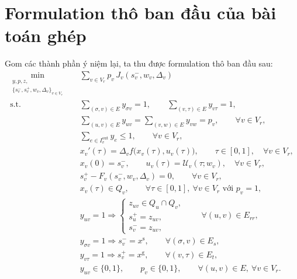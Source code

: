 \documentclass[12pt]{article}
\begin{document}
\section{Formulation thô ban đầu của bài toán ghép}

Gom các thành phần ý niệm lại, ta thu được formulation thô ban đầu sau:
\begin{align}
\min_{\substack{y,p,z,\\ \{s_v^-,s_v^+,w_v,\Delta_v\}_{v\in V_r}}}
\quad & \sum_{v\in V_r} p_v\,J_v(s_v^-,w_v,\Delta_v)
\label{eq:joint_problem_obj}\\
\text{s.t.}\quad
& \sum_{(\sigma,v)\in E} y_{\sigma v}=1,
\qquad
\sum_{(v,\tau)\in E} y_{v\tau}=1,
\label{eq:joint_problem_source_sink}\\
& \sum_{(u,v)\in E} y_{uv}
=
\sum_{(v,w)\in E} y_{vw}
=
p_v,
\qquad \forall v\in V_r,
\label{eq:joint_problem_flow}\\
& \sum_{e\in I_v^{\mathrm{out}}} y_e \le 1,
\qquad \forall v\in V_r,
\label{eq:joint_problem_acyc}\\
& x_v'(\tau)=\Delta_v f\bigl(x_v(\tau),u_v(\tau)\bigr),
\qquad \tau\in[0,1],
\quad \forall v\in V_r,
\label{eq:joint_problem_dyn}\\
& x_v(0)=s_v^-,
\qquad
u_v(\tau)=\mathcal U_v(\tau;w_v),
\quad \forall v\in V_r,
\label{eq:joint_problem_ivp}\\
& s_v^+ - F_v(s_v^-,w_v,\Delta_v)=0,
\qquad \forall v\in V_r,
\label{eq:joint_problem_defect}\\
& x_v(\tau)\in Q_v,
\qquad \forall \tau\in[0,1],\ \forall v\in V_r \text{ với } p_v=1,
\label{eq:joint_problem_region}\\
& y_{uv}=1 \Longrightarrow
\begin{cases}
z_{uv}\in Q_u\cap Q_v,\\
s_u^+=z_{uv},\\
s_v^-=z_{uv},
\end{cases}
\qquad \forall (u,v)\in E_{rr},
\label{eq:joint_problem_edge}\\
& y_{\sigma v}=1 \Longrightarrow s_v^-=x^{\mathrm s},
\qquad \forall (\sigma,v)\in E_s,
\label{eq:joint_problem_source}\\
& y_{v\tau}=1 \Longrightarrow s_v^+=x^{\mathrm g},
\qquad \forall (v,\tau)\in E_t,
\label{eq:joint_problem_target}\\
& y_{uv}\in\{0,1\},\qquad p_v\in\{0,1\},
\qquad \forall (u,v)\in E,\ \forall v\in V_r.
\label{eq:joint_problem_binary}
\end{align}
\end{document}
